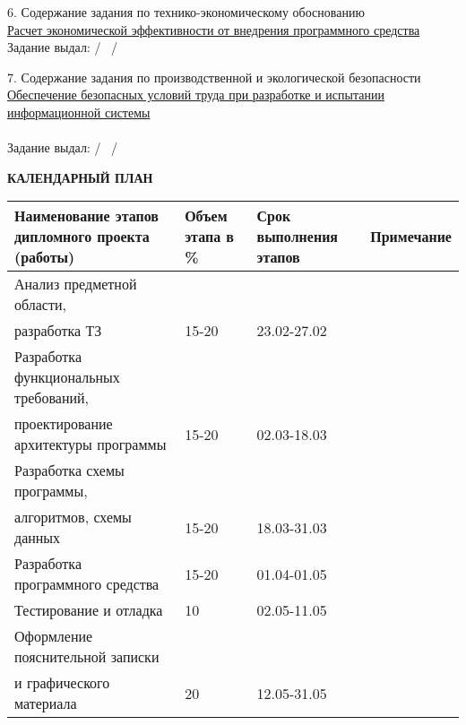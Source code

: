{  \small{6. Содержание задания по технико-экономическому обоснованию} \\
  \uline{\small{Расчет экономической эффективности от внедрения программного средства}}\lineunderscore\\

  \small{Задание выдал: \uline{\hspace*{6em}} / \diplomaTaskEconConsultant~/}
  \vspace{1em}

  \small{7. Содержание задания по производственной и экологической безопасности} \\
  \uline{\small{Обеспечение безопасных условий труда при разработке и испытании информационной системы}}\lineunderscore\\
  \lineunderscore\\

  \small{Задание выдал:  \uline{\hspace*{6em}} / \diplomaTaskLaborProtectionConsultant~/}

  \begin{center}
    \textbf{\small{КАЛЕНДАРНЫЙ ПЛАН}}
  \end{center}

  \begin{tabular}{| >{}m{} 
                  | >{\centering}m{}
                  | >{\centering}m{}  
                  | >{\centering\arraybackslash}m{}|}
    \hline \small{Наименование этапов дипломного проекта (работы)} & \small{Объем этапа в \%} & \small{Срок выполнения этапов} & \small{Примечание} \\
    \hline \small{Анализ предметной области,} & & & \\
    \hline \small{разработка ТЗ} & \small{15-20} & \small{23.02-27.02} & \\
    \hline \small{Разработка функциональных требований,} & & & \\
    \hline \small{проектирование архитектуры программы } & \small{15-20} & \small{02.03-18.03} & \\
    \hline \small{Разработка схемы программы},& & & \\
    \hline \small{алгоритмов, схемы данных} & \small{15-20} & \small{18.03-31.03} & \\
    \hline \small{Разработка программного средства} & \small{15-20} & \small{01.04-01.05} & \\
    \hline \small{Тестирование и отладка} & \small{10} & \small{02.05-11.05} & \\
    \hline \small{Оформление пояснительной записки} & & & \\
    \hline \small{и графического материала} & \small{20} & \small{12.05-31.05} & \\
    \hline
  \end{tabular}

}
